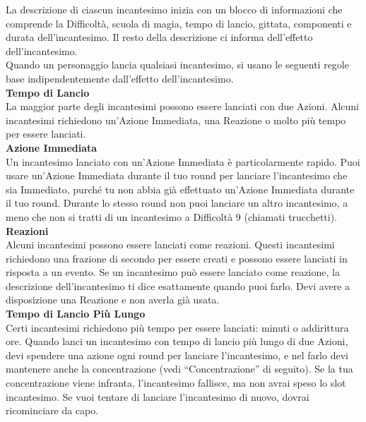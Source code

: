 La descrizione di ciascun incantesimo inizia con un  blocco di informazioni che comprende la Difficoltà, scuola di magia, tempo di lancio, gittata, componenti e durata dell'incantesimo. Il resto della descrizione ci informa  dell'effetto dell'incantesimo. \\

Quando un personaggio lancia qualsiasi incantesimo, si  usano le seguenti regole base indipendentemente dall'effetto dell'incantesimo.\\

\textbf{Tempo di Lancio}\\
La maggior parte degli incantesimi possono essere  lanciati con due Azioni. Alcuni incantesimi  richiedono un'Azione Immediata, una Reazione o molto più  tempo per essere lanciati.\\

\textbf{Azione Immediata}\\
Un incantesimo lanciato con un'Azione Immediata è particolarmente rapido. Puoi usare un'Azione Immediata  durante il tuo round per lanciare l'incantesimo che sia Immediato, purché tu  non abbia già effettuato un'Azione Immediata durante il tuo  round. Durante lo stesso round non puoi lanciare un altro  incantesimo, a meno che non si tratti di un incantesimo a Difficoltà 9 (chiamati trucchetti). \\

\textbf{Reazioni}\\
Alcuni incantesimi possono essere lanciati come reazioni. Questi incantesimi richiedono una frazione di secondo per essere creati e possono essere lanciati in risposta a un evento. Se un incantesimo può essere  lanciato come reazione, la descrizione dell'incantesimo  ti dice esattamente quando puoi farlo. Devi avere a disposizione una Reazione e non averla già usata.\\

\textbf{Tempo di Lancio Più Lungo}\\
Certi incantesimi richiedono più tempo per essere lanciati: minuti o  addirittura ore. Quando lanci un incantesimo con tempo  di lancio più lungo di due Azioni, devi spendere una azione ogni round per lanciare l'incantesimo, e nel farlo devi mantenere anche la  concentrazione (vedi “Concentrazione” di seguito). Se  la tua concentrazione viene infranta, l'incantesimo  fallisce, ma non avrai speso lo slot incantesimo. Se vuoi tentare di lanciare l'incantesimo di nuovo, dovrai ricominciare da capo.\\

